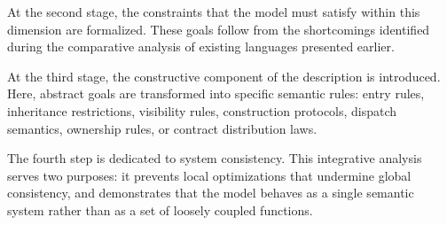At the second stage, the constraints that the model must satisfy within this dimension are formalized. These goals follow from the shortcomings identified during the comparative analysis of existing languages presented earlier. 

At the third stage, the constructive component of the description is introduced. Here, abstract goals are transformed into specific semantic rules: entry rules, inheritance restrictions, visibility rules, construction protocols, dispatch semantics, ownership rules, or contract distribution laws. 

The fourth step is dedicated to system consistency.  This integrative analysis serves two purposes: it prevents local optimizations that undermine global consistency, and demonstrates that the model behaves as a single semantic system rather than as a set of loosely coupled functions.

